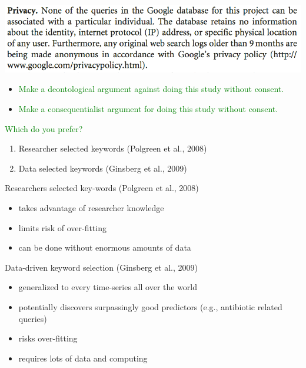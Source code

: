 \documentclass[aspectratio=169]{beamer}
\begin{document}
\begin{frame}

\begin{center}
\includegraphics[width=\textwidth]{figures/ginsberg_detecting_2009_privacy}
\end{center}
\pause

\begin{itemize}
\item \textcolor{green}{Make a deontological argument against doing this study without consent.}
\pause
\item \textcolor{green}{Make a consequentialist argument for doing this study without consent.}
\end{itemize}

\end{frame}
\begin{frame}

\textcolor{green}{Which do you prefer?}
\begin{enumerate}
\item Researcher selected keywords (Polgreen et al., 2008) 
\item Data selected keywords (Ginsberg et al., 2009)
\end{enumerate}

\end{frame}
\begin{frame}

Researchers selected key-words (Polgreen et al., 2008) 
\begin{itemize}
\item takes advantage of researcher knowledge
\item limits risk of over-fitting
\item can be done without enormous amounts of data
\end{itemize}

\pause

Data-driven keyword selection (Ginsberg et al., 2009)
\begin{itemize}
\item generalized to every time-series all over the world
\item potentially discovers surpassingly good predictors (e.g., antibiotic related queries)
\item risks over-fitting 
\item requires lots of data and computing
\end{itemize}

\end{frame}
\end{document}
